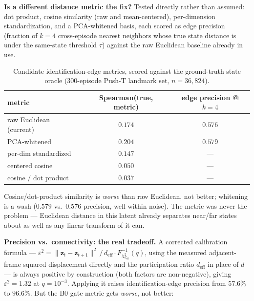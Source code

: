 \documentclass[11pt]{article}
\newcommand{\zv}{\mathbf{z}}
\begin{document}
\textbf{Is a different distance metric the fix?} Tested directly rather than assumed: dot
product, cosine similarity (raw and mean-centered), per-dimension standardization, and a
PCA-whitened basis, each scored as edge precision (fraction of $k{=}4$ cross-episode nearest
neighbors whose true state distance is under the same-state threshold $\tau$) against the raw
Euclidean baseline already in use.

\begin{table}[h]
\centering
\small
\caption{Candidate identification-edge metrics, scored against the ground-truth state oracle
(300-episode Push-T landmark set, $n{=}36{,}824$).}
\begin{tabular}{lcc}
\toprule
metric & Spearman(true, metric) & edge precision @$k{=}4$ \\
\midrule
raw Euclidean (current) & $0.174$ & $0.576$ \\
PCA-whitened & $0.204$ & $0.579$ \\
per-dim standardized & $0.147$ & --- \\
centered cosine & $0.050$ & --- \\
cosine / dot product & $0.037$ & --- \\
\bottomrule
\end{tabular}
\end{table}

Cosine/dot-product similarity is \emph{worse} than raw Euclidean, not better; whitening is a
wash ($0.579$ vs.\ $0.576$ precision, well within noise). The metric was never the problem ---
Euclidean distance in this latent already separates near/far states about as well as any linear
transform of it can.

\textbf{Precision vs.\ connectivity: the real tradeoff.} A corrected calibration formula ---
$\varepsilon^2 = \overline{\|\zv_t - \zv_{t+1}\|^2}\,/\,d_{\text{eff}} \cdot
F^{-1}_{\chi^2_{d_{\text{eff}}}}(q)$, using the measured adjacent-frame squared displacement
directly and the participation ratio $d_{\text{eff}}$ in place of $d$ --- is always positive by
construction (both factors are non-negative), giving $\varepsilon^2{=}1.32$ at $q{=}10^{-3}$.
Applying it raises identification-edge precision from $57.6\%$ to $96.6\%$. But the B0 gate
metric gets \emph{worse}, not better:
\end{document}
